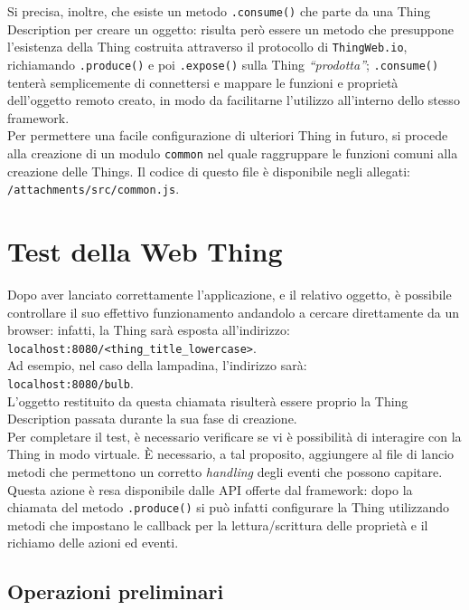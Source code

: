 \documentclass[12pt,a4paper,openright,oneside]{report}
\newcommand{\quotes}[1]{``#1''}
\begin{document}
Si precisa, inoltre, che esiste un metodo \texttt{.consume()} che parte da una Thing Description per creare un oggetto: risulta però essere un metodo che presuppone l'esistenza della Thing costruita attraverso il protocollo di \texttt{ThingWeb.io}, richiamando \texttt{.produce()} e poi \texttt{.expose()} sulla Thing \textit{\quotes{prodotta}}; \texttt{.consume()} tenterà semplicemente di connettersi e mappare le funzioni e proprietà dell'oggetto remoto creato, in modo da facilitarne l'utilizzo all'interno dello stesso framework.\\

Per permettere una facile configurazione di ulteriori Thing in futuro, si procede alla creazione di un modulo \texttt{common} nel quale raggruppare le funzioni comuni alla creazione delle Things. Il codice di questo file è disponibile negli allegati: \texttt{/attachments/src/common.js}.\\


\section{Test della Web Thing}
Dopo aver lanciato correttamente l'applicazione, e il relativo oggetto, è possibile controllare il suo effettivo funzionamento andandolo a cercare direttamente da un browser: infatti, la Thing sarà esposta all'indirizzo:\\ \texttt{localhost:8080/<thing\_title\_lowercase>}.\\ Ad esempio, nel caso della lampadina, l'indirizzo sarà:\\ \texttt{localhost:8080/bulb}.\\ L'oggetto restituito da questa chiamata risulterà essere proprio la Thing Description passata durante la sua fase di creazione.\\

Per completare il test, è necessario verificare se vi è possibilità di interagire con la Thing in modo virtuale. È necessario, a tal proposito, aggiungere al file di lancio metodi che permettono un corretto \textit{handling} degli eventi che possono capitare. Questa azione è resa disponibile dalle API offerte dal framework: dopo la chiamata del metodo \texttt{.produce()} si può infatti configurare la Thing utilizzando metodi che impostano le callback per la lettura/scrittura delle proprietà e il richiamo delle azioni ed eventi.\\

\subsection{Operazioni preliminari}
\end{document}
